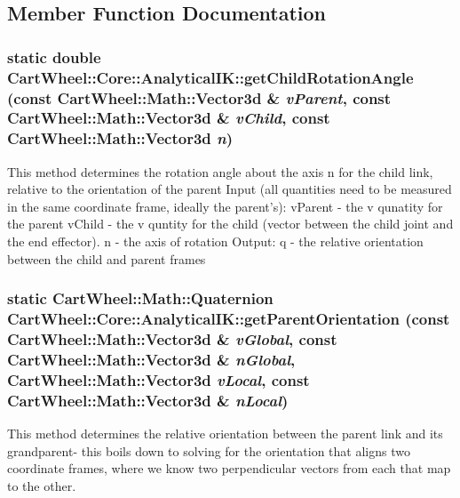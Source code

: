 \subsection{Member Function Documentation}
\hypertarget{classCartWheel_1_1Core_1_1AnalyticalIK_a008549347d167dc40c5a1c788522201c}{
\subsubsection[{getChildRotationAngle}]{\setlength{\rightskip}{0pt plus 5cm}static double CartWheel::Core::AnalyticalIK::getChildRotationAngle (const {\bf CartWheel::Math::Vector3d} \& {\em vParent}, \/  const {\bf CartWheel::Math::Vector3d} \& {\em vChild}, \/  const {\bf CartWheel::Math::Vector3d} {\em n})}}
\label{classCartWheel_1_1Core_1_1AnalyticalIK_a008549347d167dc40c5a1c788522201c}
This method determines the rotation angle about the axis n for the child link, relative to the orientation of the parent Input (all quantities need to be measured in the same coordinate frame, ideally the parent's): vParent -\/ the v qunatity for the parent vChild -\/ the v quntity for the child (vector between the child joint and the end effector). n -\/ the axis of rotation Output: q -\/ the relative orientation between the child and parent frames \hypertarget{classCartWheel_1_1Core_1_1AnalyticalIK_aa99c96d71da77221f652ec281457f586}{
\subsubsection[{getParentOrientation}]{\setlength{\rightskip}{0pt plus 5cm}static {\bf CartWheel::Math::Quaternion} CartWheel::Core::AnalyticalIK::getParentOrientation (const {\bf CartWheel::Math::Vector3d} \& {\em vGlobal}, \/  const {\bf CartWheel::Math::Vector3d} \& {\em nGlobal}, \/  {\bf CartWheel::Math::Vector3d} {\em vLocal}, \/  const {\bf CartWheel::Math::Vector3d} \& {\em nLocal})}}
\label{classCartWheel_1_1Core_1_1AnalyticalIK_aa99c96d71da77221f652ec281457f586}
This method determines the relative orientation between the parent link and its grandparent-\/ this boils down to solving for the orientation that aligns two coordinate frames, where we know two perpendicular vectors from each that map to the other.

